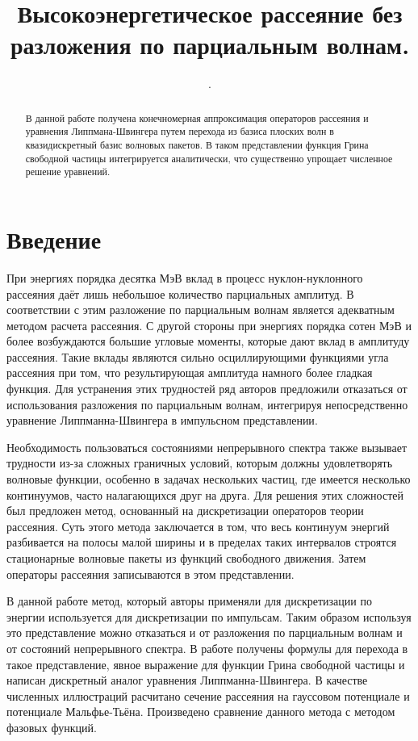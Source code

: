 \documentclass[a4paper,12pt]{article}
\title{Высокоэнергетическое рассеяние без разложения по парциальным волнам.}
\author{.}
\begin{document}
	
	\setcounter{page}{2}
	
	\tableofcontents
    \pagebreak
     
	\begin{abstract}
		В данной работе получена конечномерная аппроксимация операторов рассеяния и уравнения Липпмана-Швингера путем перехода из базиса плоских волн в квазидискретный базис волновых пакетов. В таком представлении функция Грина свободной частицы интегрируется аналитически, что существенно упрощает численное решение уравнений.
	\end{abstract}
	\pagebreak

	\section{Введение}
При энергиях порядка десятка МэВ вклад в процесс нуклон-нуклонного рассеяния даёт лишь небольшое количество парциальных амплитуд. В соответствии с этим разложение по парциальным волнам является адекватным методом расчета рассеяния. С другой стороны при энергиях порядка сотен МэВ и более возбуждаются большие угловые моменты, которые дают вклад в амплитуду рассеяния. Такие вклады являются сильно осциллирующими функциями угла рассеяния при том, что результирующая амплитуда намного более гладкая функция. Для устранения этих трудностей ряд авторов предложили отказаться от использования разложения по парциальным волнам, интегрируя непосредственно уравнение Липпманна-Швингера в импульсном представлении\cite{elster}.

Необходимость пользоваться состояниями непрерывного спектра также вызывает трудности из-за сложных граничных условий, которым должны удовлетворять волновые функции, особенно в задачах нескольких частиц, где имеется несколько континуумов, часто налагающихся друг на друга. Для решения этих сложностей был предложен метод\cite{kuku2}\cite{kuku1}, основанный на дискретизации операторов теории рассеяния. Суть этого метода заключается в том, что весь континуум энергий разбивается на полосы малой ширины и в пределах таких интервалов строятся стационарные волновые пакеты из функций свободного движения. Затем операторы рассеяния записываются в этом представлении.

В данной работе метод, который авторы \cite{kuku2}\cite{kuku1} применяли для дискретизации по энергии используется для дискретизации по импульсам. %
Таким образом используя это представление можно отказаться и от разложения по парциальным волнам и от состояний непрерывного спектра. В работе получены формулы для перехода в такое представление, явное выражение для функции Грина свободной частицы и написан дискретный аналог уравнения Липпманна-Швингера. В качестве численных иллюстраций расчитано сечение рассеяния на гауссовом потенциале и потенциале Мальфье-Тьёна. Произведено сравнение данного метода с методом фазовых функций\cite{babik}.
\end{document}

